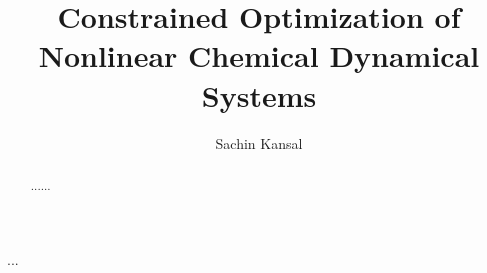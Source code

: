 \documentclass[11pt]{report}
\begin{document}
\dedication{\large To Love, Peace, and the Brotherhood of Man}%
%
%
%
%
%
%
%
%
%
%
%
%
%
%
%
%
%
%
%
%
%
%
%
%
%
%
%
%
%
%
%
%
%
%
%
%
%
%
%

\title{Constrained Optimization of Nonlinear Chemical Dynamical Systems}
\author{Sachin Kansal}%
%
%
%
%
%
%
%
%
%
%
%
%
%
%
%
%
%
%
%
%
%
%
%
%
%
%
%
%
%
%
%
%
%
%
%
%
%
%
%

\admin  	%
%
%
%
%
%
%
%
%
%
%
%
%
%
%
%
%
%
%
%
%
%
%
%
%
%
%
%
%
%
%
%
%
%
%
%
%
%
%
%
%

\begin{acknowledgements}
...
\end{acknowledgements}
%
%
%
%
%
%
%
%
%
%
%
%
%
%
%
%
%
%
%
%
%
%
%
%
%
%
%
%
%
%
%
%
%
%
%
%
%
%
%
%

\doublespacing		%

\begin{abstract}
......
\end{abstract}%
%
%
%
%
%
%
%
%
%
%
%
%
%
%
%
%
%
%
%
%
%
%
%
%
%
%
%
%
%
%
%
%
%
%
%
%
%
%
%
%
%
%
%
%
%
%

\onehalfspacing	%

\tableofcontents
\listoffigures
\listoftables
%
%
%
%
%
%
%
%
%
%
%
%
%
%
%
%
%
%
%
%
%
%
%
%
%
%
%
%
%
%
%
%
%
%
%
%
%
%
%
%
%
\end{document}
